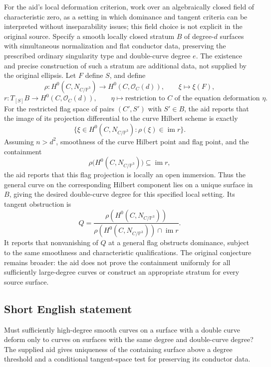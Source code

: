 \documentclass[11pt]{article}
\newcommand{\PP}{\mathbb{P}}
\begin{document}
For the aid's local deformation criterion, work over an algebraically closed field of characteristic zero, as a setting in which dominance and tangent criteria can be interpreted without inseparability issues; this field choice is not explicit in the original source. Specify a smooth locally closed stratum \(B\) of degree-\(d\) surfaces with simultaneous normalization and flat conductor data, preserving the prescribed ordinary singularity type and double-curve degree \(e\). The existence and precise construction of such a stratum are additional data, not supplied by the original ellipsis. Let \(F\) define \(S\), and define
\[
 \rho:H^0(C,N_{C/\PP^3})\longrightarrow H^0(C,\mathcal O_C(d)),
 \qquad \xi\longmapsto\xi(F),
\]
\[
 r:T_{[S]}B\longrightarrow H^0(C,\mathcal O_C(d)),
 \qquad \eta\longmapsto\text{restriction to }C\text{ of the equation deformation }\eta.
\]
For the restricted flag space of pairs \((C',S')\) with \(S'\in B\), the aid reports that the image of its projection differential to the curve Hilbert scheme is exactly
\[
 \{\xi\in H^0(C,N_{C/\PP^3}):\rho(\xi)\in\operatorname{im}r\}.
\]
Assuming \(n>d^2\), smoothness of the curve Hilbert point and flag point, and the containment
\[
 \rho\bigl(H^0(C,N_{C/\PP^3})\bigr)\subseteq\operatorname{im}r,
\]
the aid reports that this flag projection is locally an open immersion. Thus the general curve on the corresponding Hilbert component lies on a unique surface in \(B\), giving the desired double-curve degree for this specified local setting. Its tangent obstruction is
\[
 Q=\frac{\rho(H^0(C,N_{C/\PP^3}))}
 {\rho(H^0(C,N_{C/\PP^3}))\cap\operatorname{im}r}.
\]
It reports that nonvanishing of \(Q\) at a general flag obstructs dominance, subject to the same smoothness and characteristic qualifications. The original conjecture remains broader: the aid does not prove the containment uniformly for all sufficiently large-degree curves or construct an appropriate stratum for every source surface.
\subsection{Short English statement}
Must sufficiently high-degree smooth curves on a surface with a double curve deform only to curves on surfaces with the same degree and double-curve degree? The supplied aid gives uniqueness of the containing surface above a degree threshold and a conditional tangent-space test for preserving its conductor data.
\end{document}
